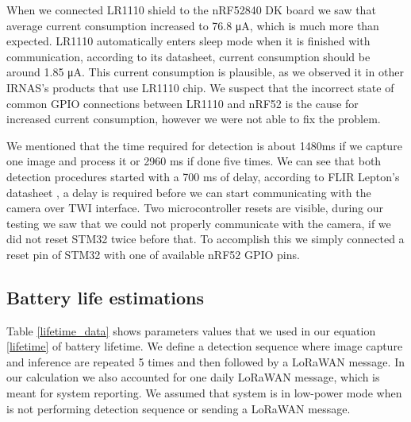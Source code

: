When we connected LR1110 shield to the nRF52840 DK board we saw that average current consumption increased to 76.8 \si{\micro\ampere}, which is much more than expected.
LR1110 automatically enters sleep mode when it is finished with communication, according to its datasheet\cite{lr1110_datasheet}, current consumption should be around 1.85 \si{\micro\ampere}.
This current consumption is plausible, as we observed it in other IRNAS's products that use LR1110 chip.
We suspect that the incorrect state of common GPIO connections between LR1110 and nRF52 is the cause for increased current consumption, however we were not able to fix the problem.

We mentioned that the time required for detection is about 1480\si{\milli\second} if we capture one image and process it or 2960 \si{\milli\second} if done five times.
We can see that both detection procedures started with a 700 \si{\milli\second} of delay, according to FLIR Lepton's datasheet \cite{flir_datasheet}, a delay is required before we can start communicating with the camera over TWI interface.
Two microcontroller resets are visible, during our testing we saw that we could not properly communicate with the camera, if we did not reset STM32 twice before that.
To accomplish this we simply connected a reset pin of STM32 with one of available nRF52 GPIO pins.


\subsection{ Battery life estimations}

Table \ref{lifetime_data} shows parameters values that we used in our equation \ref{lifetime} of battery lifetime.
We define a detection sequence where image capture and inference are repeated 5 times and then followed by a LoRaWAN message.
In our calculation we also accounted for one daily LoRaWAN message, which is meant for system reporting.
We assumed that system is in low-power mode when is not performing detection sequence or sending a LoRaWAN message.

